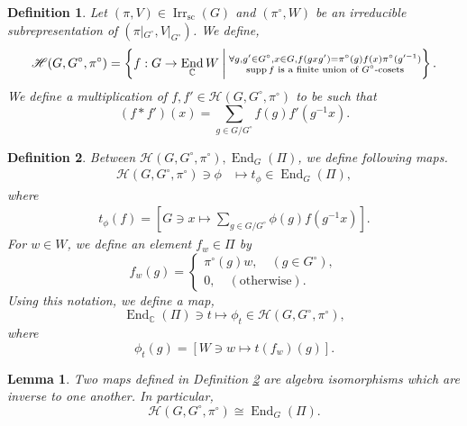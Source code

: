 \documentclass[8pt]{article}
\newtheorem{definition}{Definition}[section]
\newtheorem{lemma}{Lemma}[section]
\DeclareMathOperator{\End}{End}
\DeclareMathOperator{\supp}{supp}
\DeclareMathOperator{\supcus}{sc}
\DeclareMathOperator{\Irr}{Irr}
\newcommand{\C}[0]{\mathbb{C}}
\newcommand{\hecke}[0]{\mathscr{H}}
\begin{document}
\begin{definition}
  Let $(\pi,V)\in\Irr_{\supcus}(G)$ and $(\pi^\circ,W)$ be an irreducible subrepresentation of $(\pi|_{G^\circ},V|_{G^\circ})$. We define,
  \begin{equation*}
    \hecke(G,G^\circ,\pi^\circ) = \left\{f:G\to\End_\C W\:\bigg{|}\:\substack{\forall g,g'\in G^\circ, x\in G, f(gxg') = \pi^\circ(g)f(x)\pi^\circ(g'^{-1})\\ \text{$\supp f$ is a finite union of $G^\circ$-cosets}}\right\}.
  \end{equation*}
  We define a multiplication of $f,f'\in\hecke(G,G^\circ,\pi^\circ)$ to be such that 
  \begin{equation*}
    (f\ast f')(x) = \sum_{g\in G/G^\circ}f(g)f'(g^{-1}x).
  \end{equation*}
\end{definition}
\begin{definition}
  Between $\hecke(G,G^\circ,\pi^\circ),\End_G(\Pi)$, we define following maps.
  \begin{align*}
    \hecke(G,G^\circ,\pi^\circ)\ni \phi&\mapsto t_\phi\in\End_G(\Pi),
  \end{align*}
  where
  \begin{align*}
    t_\phi(f) = \left[G\ni x\mapsto \sum_{g\in G/G^\circ}\phi(g)f(g^{-1}x)\right].
  \end{align*}
  For $w\in W$, we define an element $f_w\in \Pi$ by  
  \begin{equation*}
    f_w(g) = \begin{cases}
      \pi^\circ(g)w,\quad(g\in G^\circ),\\
      0,\quad(\text{otherwise}).
    \end{cases}
  \end{equation*}
  Using this notation, we define a map,
  \begin{equation*}
    \End_\C(\Pi)\ni t\mapsto \phi_t\in\hecke(G,G^\circ,\pi^\circ),
  \end{equation*}
  where 
  \begin{equation*}
    \phi_t(g) = [W\ni w\mapsto t(f_w)(g)].
  \end{equation*}
  \label{definition_hecke_end_morphisms}
\end{definition}
\begin{lemma}
  \label{lemma_67}
  Two maps defined in Definition \ref{definition_hecke_end_morphisms} are algebra isomorphisms which are inverse to one another. In particular,
  \begin{equation*}
    \hecke(G,G^\circ,\pi^\circ)\cong \End_G(\Pi).
  \end{equation*}
\end{lemma}
\end{document}
